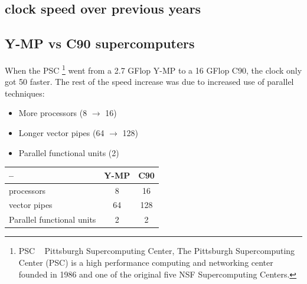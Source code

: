 \documentclass[12pt, a4paper]{book}
\begin{document}
\subsection{clock speed over previous years}
\begin{figure}[h]
    \centering
\end{figure}

\subsection{Y-MP vs C90 supercomputers}
When the PSC \footnote{PSC ~ Pittsburgh Supercomputing Center, The Pittsburgh Supercomputing Center (PSC) is a high performance computing and networking center founded in 1986 and one of the original five NSF Supercomputing Centers.} went from a 2.7 GFlop Y-MP
to a 16 GFlop C90, the clock only got 50%
faster. The rest of the speed increase was
due to increased use of parallel techniques:
\begin{itemize}
    \item More processors (8 $\rightarrow$ 16)
    \item Longer vector pipes (64 $\rightarrow$ 128)
    \item Parallel functional units (2)
\end{itemize}

\begin{table}[h]
    \centering
    \begin{tabular}{l|c|c}
        --                        & Y-MP & C90 \\
        \hline
        processors                & 8    & 16  \\
        \hline
        vector pipes              & 64   & 128 \\
        \hline
        Parallel functional units & 2    & 2   \\
    \end{tabular}
\end{table}
\end{document}
